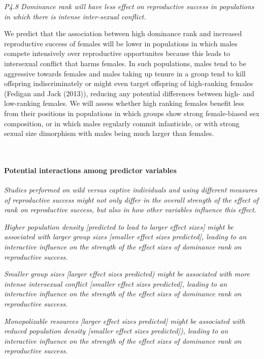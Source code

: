 \documentclass[]{article}
\let\oldparagraph\paragraph
\renewcommand{\paragraph}[1]{\oldparagraph{#1}\mbox{}}
\begin{document}
\emph{P4.8 Dominance rank will have less effect on reproductive success
in populations in which there is intense inter-sexual conflict.}

We predict that the association between high dominance rank and
increased reproductive success of females will be lower in populations
in which males compete intensively over reproductive opportunites
because this leads to intersexual conflict that harms females. In such
populations, males tend to be aggressive towards females and males
taking up tenure in a group tend to kill offspring indiscriminately or
might even target offspring of high-ranking females (Fedigan and Jack
(2013)), reducing any potential differences between high- and
low-ranking females. We will assess whether high ranking females benefit
less from their positions in populations in which groups show strong
female-biased sex composition, or in which males regularly commit
infanticide, or with strong sexual size dimorphism with males being much
larger than females.

~

\hypertarget{potential-interactions-among-predictor-variables}{%
\paragraph{\texorpdfstring{\textbf{Potential interactions among
predictor
variables}}{Potential interactions among predictor variables}}\label{potential-interactions-among-predictor-variables}}

\emph{Studies performed on wild versus captive individuals and using
different measures of reproductive success might not only differ in the
overall strength of the effect of rank on reproductive success, but also
in how other variables influence this effect.}

\emph{Higher population density {[}predicted to lead to larger effect
sizes{]} might be associated with larger group sizes {[}smaller effect
sizes predicted{]}, leading to an interactive influence on the strength
of the effect sizes of dominance rank on reproductive success.}

\emph{Smaller group sizes {[}larger effect sizes predicted) might be
associated with more intense intersexual conflict {[}smaller effect
sizes predicted{]}, leading to an interactive influence on the strength
of the effect sizes of dominance rank on reproductive success.}

\emph{Monopolizable resources {[}larger effect sizes predicted{]} might
be associated with reduced population density {[}smaller effect sizes
predicted{]}), leading to an interactive influence on the strength of
the effect sizes of dominance rank on reproductive success.}
\end{document}
